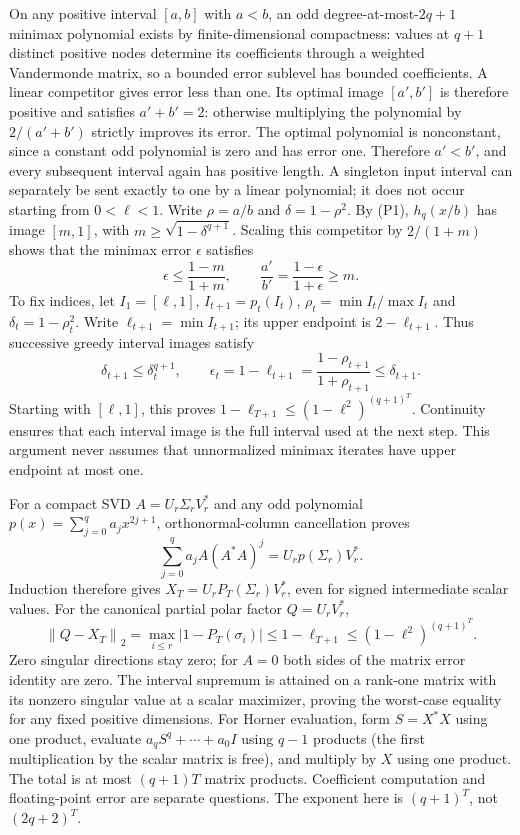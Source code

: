 \documentclass[11pt,a4paper]{article}
\newcommand{\norm}[1]{\left\lVert#1\right\rVert}
\begin{document}
On any positive interval $[a,b]$ with $a<b$, an odd degree-at-most-$2q+1$ minimax
polynomial exists by finite-dimensional compactness: values at $q+1$
distinct positive nodes determine its coefficients through a weighted
Vandermonde matrix, so a bounded error sublevel has bounded coefficients.
A linear competitor gives error less than one. Its optimal image
$[a',b']$ is therefore positive and satisfies $a'+b'=2$: otherwise
multiplying the polynomial by $2/(a'+b')$ strictly improves its error.
The optimal polynomial is nonconstant, since a constant odd polynomial
is zero and has error one. Therefore $a'<b'$, and every subsequent
interval again has positive length. A singleton input interval can
separately be sent exactly to one by a linear polynomial; it does not
occur starting from $0<\ell<1$.
Write $\rho=a/b$ and $\delta=1-\rho^2$. By (P1), $h_q(x/b)$ has image
$[m,1]$, with $m\ge\sqrt{1-\delta^{q+1}}$. Scaling this competitor by
$2/(1+m)$ shows that the minimax error $\epsilon$ satisfies
\[
 \epsilon\le\frac{1-m}{1+m},\qquad
 \frac{a'}{b'}=\frac{1-\epsilon}{1+\epsilon}\ge m.
\]
To fix indices, let $I_1=[\ell,1]$, $I_{t+1}=p_t(I_t)$,
$\rho_t=\min I_t/\max I_t$ and $\delta_t=1-\rho_t^2$.
Write $\ell_{t+1}=\min I_{t+1}$; its upper endpoint is
$2-\ell_{t+1}$. Thus successive greedy interval images satisfy
\[
 \delta_{t+1}\le\delta_t^{q+1},\qquad
 \epsilon_t=1-\ell_{t+1}
 =\frac{1-\rho_{t+1}}{1+\rho_{t+1}}\le\delta_{t+1}.
\]
Starting with $[\ell,1]$, this proves
$1-\ell_{T+1}\le(1-\ell^2)^{(q+1)^T}$.
Continuity ensures that each interval image is the full interval used at
the next step. This argument never assumes that unnormalized minimax
iterates have upper endpoint at most one.

For a compact SVD $A=U_r\Sigma_rV_r^*$ and any odd polynomial
$p(x)=\sum_{j=0}^qa_jx^{2j+1}$, orthonormal-column cancellation proves
\[
 \sum_{j=0}^qa_jA(A^*A)^j=U_rp(\Sigma_r)V_r^*.
\]
Induction therefore gives $X_T=U_rP_T(\Sigma_r)V_r^*$, even for signed
intermediate scalar values. For the canonical partial polar factor
$Q=U_rV_r^*$,
\[
 \norm{Q-X_T}_2=\max_{i\le r}|1-P_T(\sigma_i)|
 \le1-\ell_{T+1}\le(1-\ell^2)^{(q+1)^T}.
\]
Zero singular directions stay zero; for $A=0$ both sides of the matrix
error identity are zero. The interval supremum is attained on a rank-one
matrix with its nonzero singular value at a scalar maximizer, proving
the worst-case equality for any fixed positive dimensions.
For Horner evaluation, form $S=X^*X$ using one product, evaluate
$a_qS^q+\cdots+a_0I$ using $q-1$ products (the first multiplication by
the scalar matrix is free), and multiply by $X$ using one product.
The total is at most $(q+1)T$ matrix products. Coefficient computation and
floating-point error are separate questions. The exponent here is
$(q+1)^T$, not $(2q+2)^T$.
\end{document}

